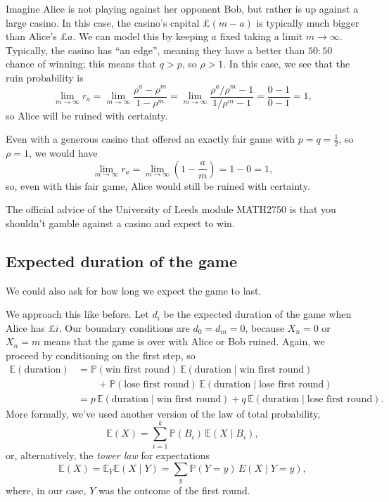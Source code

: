 \documentclass[
  a4paper,
]{article}
\theoremstyle{definition}
\theoremstyle{definition}
\theoremstyle{definition}
\theoremstyle{remark}
\begin{document}
Imagine Alice is not playing against her opponent Bob, but rather is up against a large casino. In this case, the casino's capital £\((m-a)\) is typically much bigger than Alice's £\(a\). We can model this by keeping \(a\) fixed taking a limit \(m \to \infty\). Typically, the casino has ``an edge'', meaning they have a better than \(50:50\) chance of winning; this means that \(q > p\), so \(\rho > 1\). In this case, we see that the ruin probability is
\[ \lim_{m \to \infty} r_a = \lim_{m \to \infty} \frac{\rho^a - \rho^m}{1 - \rho^m} = \lim_{m \to \infty} \frac{\rho^a/\rho^m - 1}{1/\rho^m - 1} = \frac{0-1}{0-1} = 1, \]
so Alice will be ruined with certainty.

Even with a generous casino that offered an exactly fair game with \(p = q = \frac12\), so \(\rho = 1\), we would have
\[ \lim_{m \to \infty} r_a = \lim_{m \to \infty}\left( 1 - \frac{a}{m} \right) = 1-0 = 1 , \]
so, even with this fair game, Alice would still be ruined with certainty.

The official advice of the University of Leeds module MATH2750 is that you shouldn't gamble against a casino and expect to win.

\hypertarget{expected-duration}{%
\subsection{Expected duration of the game}\label{expected-duration}}

We could also ask for how long we expect the game to last.

We approach this like before. Let \(d_i\) be the expected duration of the game when Alice has £\(i\). Our boundary conditions are \(d_0 = d_m = 0\), because \(X_n = 0\) or \(X_n = m\) means that the game is over with Alice or Bob ruined. Again, we proceed by conditioning on the first step, so
\begin{align*}
\mathbb E(\text{duration}) &= \mathbb P(\text{win first round}) \, \mathbb E(\text{duration} \mid \text{win first round}) \\
&\qquad{}+ \mathbb P(\text{lose first round}) \, \mathbb E(\text{duration} \mid \text{lose first round}) \\
&= p\,\mathbb E(\text{duration} \mid \text{win first round}) + q \,\mathbb E(\text{duration} \mid \text{lose first round}) .
\end{align*}
More formally, we've used another version of the law of total probability,
\[ \mathbb E(X) = \sum_{i=1}^k \mathbb P(B_i) \, \mathbb E(X \mid B_i) , \]
or, alternatively, the \emph{tower law} for expectations
\[ \mathbb E(X) = \mathbb E_Y \mathbb E (X \mid Y) = \sum_{y} \mathbb P(Y= y)\, E(X \mid Y = y), \]
where, in our case, \(Y\) was the outcome of the first round.
\end{document}
